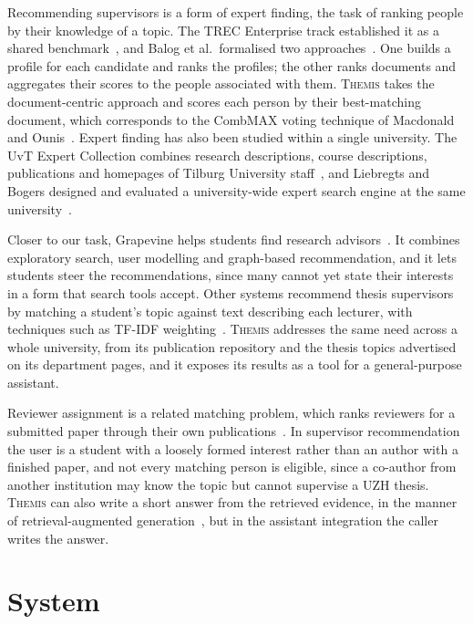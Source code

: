 \documentclass[sigconf,nonacm]{acmart}
\newcommand{\sys}{\textsc{Themis}}
\begin{document}
Recommending supervisors is a form of expert finding, the task of ranking people by their knowledge of a topic. The TREC Enterprise track established it as a shared benchmark~\cite{craswell2005overview}, and Balog et al.\ formalised two approaches~\cite{balog2006formal,balog2012expertise}. One builds a profile for each candidate and ranks the profiles; the other ranks documents and aggregates their scores to the people associated with them. \sys{} takes the document-centric approach and scores each person by their best-matching document, which corresponds to the CombMAX voting technique of Macdonald and Ounis~\cite{macdonald2006voting}. Expert finding has also been studied within a single university. The UvT Expert Collection combines research descriptions, course descriptions, publications and homepages of Tilburg University staff~\cite{balog2007broad}, and Liebregts and Bogers designed and evaluated a university-wide expert search engine at the same university~\cite{liebregts2009design}.

Closer to our task, Grapevine helps students find research advisors~\cite{rahdari2020grapevine,rahdari2021connecting}. It combines exploratory search, user modelling and graph-based recommendation, and it lets students steer the recommendations, since many cannot yet state their interests in a form that search tools accept. Other systems recommend thesis supervisors by matching a student's topic against text describing each lecturer, with techniques such as TF-IDF weighting~\cite{rismanto2020supervisor,wijanto2020thesis}. \sys{} addresses the same need across a whole university, from its publication repository and the thesis topics advertised on its department pages, and it exposes its results as a tool for a general-purpose assistant.

Reviewer assignment is a related matching problem, which ranks reviewers for a submitted paper through their own publications~\cite{mimno2007expertise,charlin2013toronto}. In supervisor recommendation the user is a student with a loosely formed interest rather than an author with a finished paper, and not every matching person is eligible, since a co-author from another institution may know the topic but cannot supervise a UZH thesis. \sys{} can also write a short answer from the retrieved evidence, in the manner of retrieval-augmented generation~\cite{lewis2020rag}, but in the assistant integration the caller writes the answer.

\section{System}\label{sec:system}
\end{document}
